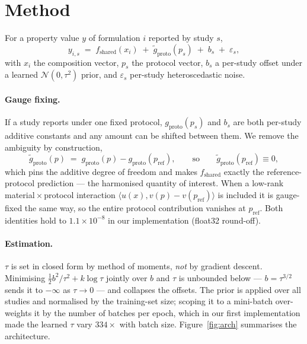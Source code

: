 \documentclass[11pt]{article}
\begin{document}
\section{Method}
\label{sec:method}

For a property value $y$ of formulation $i$ reported by study $s$,
\begin{equation}
  y_{i,s} \;=\; f_{\mathrm{shared}}(x_i)
            \;+\; \tilde g_{\mathrm{proto}}(p_s)
            \;+\; b_s \;+\; \varepsilon_s ,
  \label{eq:model}
\end{equation}
with $x_i$ the composition vector, $p_s$ the protocol vector, $b_s$ a
per-study offset under a learned $\mathcal{N}(0,\tau^2)$ prior, and
$\varepsilon_s$ per-study heteroscedastic noise.

\paragraph{Gauge fixing.}
If a study reports under one fixed protocol, $g_{\mathrm{proto}}(p_s)$ and
$b_s$ are both per-study additive constants and any amount can be shifted
between them. We remove the ambiguity by construction,
\begin{equation}
  \tilde g_{\mathrm{proto}}(p) \;=\; g_{\mathrm{proto}}(p)
                                   - g_{\mathrm{proto}}(p_{\mathrm{ref}}),
  \qquad\text{so}\qquad
  \tilde g_{\mathrm{proto}}(p_{\mathrm{ref}}) \equiv 0 ,
\end{equation}
which pins the additive degree of freedom and makes $f_{\mathrm{shared}}$
exactly the reference-protocol prediction --- the harmonised quantity of
interest. When a low-rank material\,$\times$\,protocol interaction
$\langle u(x), v(p) - v(p_{\mathrm{ref}})\rangle$ is included it is gauge-fixed
the same way, so the entire protocol contribution vanishes at
$p_{\mathrm{ref}}$. Both identities hold to $1.1\times10^{-8}$ in our
implementation (float32 round-off).

\paragraph{Estimation.}
$\tau$ is set in closed form by method of moments, \emph{not} by gradient
descent. Minimising $\tfrac12 b^2/\tau^2 + k\log\tau$ jointly over $b$ and
$\tau$ is unbounded below --- $b = \tau^{3/2}$ sends it to $-\infty$ as
$\tau\to0$ --- and collapses the offsets. The prior is applied over all studies
and normalised by the training-set size; scoping it to a mini-batch
over-weights it by the number of batches per epoch, which in our first
implementation made the learned $\tau$ vary $334\times$ with batch size.
Figure~\ref{fig:arch} summarises the architecture.
\end{document}
